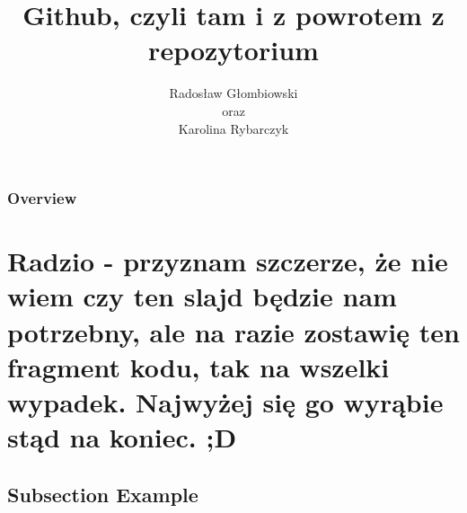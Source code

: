\documentclass[9pt]{beamer}
\title[To w tym szablonie i tak nie działa]{\Huge Github, czyli tam i z powrotem z repozytorium} %
\author{Radosław Głombiowski\\oraz\\Karolina Rybarczyk} %
\institute{
Uniwesytet Gdański\\ %
\medskip
\textit{john@smith.com, szprota@rybki.com.pl} %
}
\date{} %
\begin{document}
	\begin{frame}
		\titlepage %
	\end{frame}


	\begin{frame}
		\frametitle{Overview} %
		\tableofcontents %
	\end{frame}


	\section{Radzio - przyznam szczerze, że nie wiem czy ten slajd będzie nam potrzebny, ale na razie zostawię ten fragment kodu, tak na wszelki wypadek. Najwyżej się go wyrąbie stąd na koniec. ;D} %


	\subsection{Subsection Example} %


\end{document}
